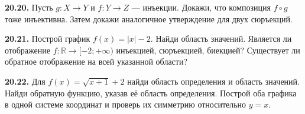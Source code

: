 \noindent\begin{minipage}[t]{\linewidth}\textbf{20.20.}\starmark{} Пусть \(g:X\to Y\) и \(f:Y\to Z\) — инъекции. Докажи, что композиция \(f\circ g\) тоже инъективна. Затем докажи аналогичное утверждение для двух сюръекций.\par\end{minipage}\par
\noindent\begin{minipage}[t]{\linewidth}\textbf{20.21.} Построй график \(f(x)=|x|-2\). Найди область значений. Является ли отображение \(f:\mathbb R\to[-2;+\infty)\) инъекцией, сюръекцией, биекцией? Существует ли обратное отображение на всей указанной области?\par\end{minipage}\par
\noindent\begin{minipage}[t]{\linewidth}\textbf{20.22.}\starmark{} Для \(f(x)=\sqrt{x+1}+2\) найди область определения и область значений. Найди обратную функцию, указав её область определения. Построй оба графика в одной системе координат и проверь их симметрию относительно \(y=x\).\par\end{minipage}\par
\endgroup
